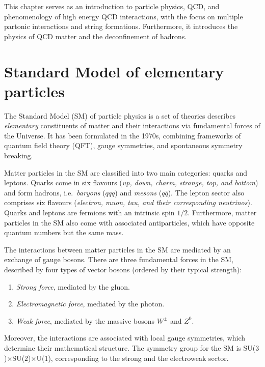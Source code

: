 \def \imgpath {"./figures/intro"}

This chapter serves as an introduction to particle physics, QCD, and phenomenology of high energy QCD interactions, with the focus on multiple partonic interactions and string formations. Furthermore, it introduces the physics of QCD matter and the deconfinement of hadrons.

\section{Standard Model of elementary particles}

The Standard Model (SM) of particle physics is a set of theories describes \textit{elementary} constituents of matter and their interactions via fundamental forces of the Universe. It has been formulated in the 1970s, combining frameworks of quantum field theory (QFT), gauge symmetries, and spontaneous symmetry breaking.

Matter particles in the SM are classified into two main categories: quarks and leptons. Quarks come in six flavours (\textit{up, down, charm, strange, top, and bottom}) and form hadrons, i.e.\ \textit{baryons} ($qqq$) and \textit{mesons} ($q\bar{q}$). The lepton sector also comprises six flavours (\textit{electron, muon, tau, and their corresponding neutrinos}). Quarks and leptons are fermions with an intrinsic spin $1/2$. Furthermore, matter particles in the SM also come with associated antiparticles, which have opposite quantum numbers but the same mass.

The interactions between matter particles in the SM are mediated by an exchange of gauge bosons. There are three fundamental forces in the SM, described by four types of vector bosons (ordered by their typical strength): 
\begin{enumerate}
\item \textit{Strong force}, mediated by the gluon.
\item \textit{Electromagnetic force}, mediated by the photon.
\item \textit{Weak force}, mediated by the massive bosons $W^\pm$ and $Z^0$.
\end{enumerate} 

Moreover, the interactions are associated with local gauge symmetries, which determine their mathematical structure. The symmetry group for the SM is SU($3$)$\times$SU($2$)$\times$U($1$), corresponding to the strong and the electroweak sector. \cite{tanabashiReviewParticlePhysics2018}

